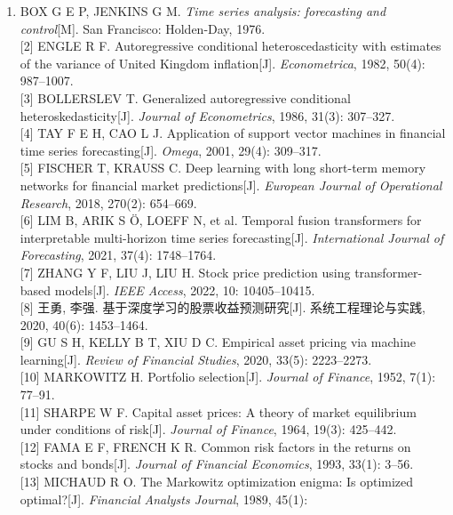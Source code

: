 \documentclass[UTF8]{ctexart}
\begin{document}
\begin{enumerate}
\def\labelenumi{\arabic{enumi}.}
\item
  BOX G E P, JENKINS G M. \emph{Time series analysis: forecasting and
  control}{[}M{]}. San Francisco: Holden-Day, 1976.\\
  {[}2{]} ENGLE R F. Autoregressive conditional heteroscedasticity with
  estimates of the variance of United Kingdom inflation{[}J{]}.
  \emph{Econometrica}, 1982, 50(4): 987--1007.\\
  {[}3{]} BOLLERSLEV T. Generalized autoregressive conditional
  heteroskedasticity{[}J{]}. \emph{Journal of Econometrics}, 1986,
  31(3): 307--327.\\
  {[}4{]} TAY F E H, CAO L J. Application of support vector machines in
  financial time series forecasting{[}J{]}. \emph{Omega}, 2001, 29(4):
  309--317.\\
  {[}5{]} FISCHER T, KRAUSS C. Deep learning with long short-term memory
  networks for financial market predictions{[}J{]}. \emph{European
  Journal of Operational Research}, 2018, 270(2): 654--669.\\
  {[}6{]} LIM B, ARIK S Ö, LOEFF N, et al. Temporal fusion transformers
  for interpretable multi-horizon time series forecasting{[}J{]}.
  \emph{International Journal of Forecasting}, 2021, 37(4):
  1748--1764.\\
  {[}7{]} ZHANG Y F, LIU J, LIU H. Stock price prediction using
  transformer-based models{[}J{]}. \emph{IEEE Access}, 2022, 10:
  10405--10415.\\
  {[}8{]} 王勇, 李强. 基于深度学习的股票收益预测研究{[}J{]}.
  系统工程理论与实践, 2020, 40(6): 1453--1464.\\
  {[}9{]} GU S H, KELLY B T, XIU D C. Empirical asset pricing via
  machine learning{[}J{]}. \emph{Review of Financial Studies}, 2020,
  33(5): 2223--2273.\\
  {[}10{]} MARKOWITZ H. Portfolio selection{[}J{]}. \emph{Journal of
  Finance}, 1952, 7(1): 77--91.\\
  {[}11{]} SHARPE W F. Capital asset prices: A theory of market
  equilibrium under conditions of risk{[}J{]}. \emph{Journal of
  Finance}, 1964, 19(3): 425--442.\\
  {[}12{]} FAMA E F, FRENCH K R. Common risk factors in the returns on
  stocks and bonds{[}J{]}. \emph{Journal of Financial Economics}, 1993,
  33(1): 3--56.\\
  {[}13{]} MICHAUD R O. The Markowitz optimization enigma: Is optimized
  optimal?{[}J{]}. \emph{Financial Analysts Journal}, 1989, 45(1):

\end{enumerate}
\end{document}
